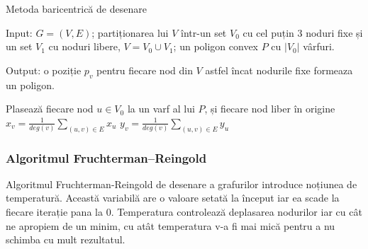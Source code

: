 \begin{algorithm}[H]
    \caption{Metoda baricentrică de desenare}
    Input: \(G=(V,E)\);\newline
    partiționarea lui \(V\) într-un set \(V_0\) cu cel puțin 3 noduri fixe și un set \(V_1\) cu noduri libere, \(V=V_0 \cup V_1\);\newline
    un poligon convex \(P\) cu \(|V_0|\) vârfuri.\newline

    Output: o poziție \(p_v\) pentru fiecare nod din \(V\) astfel încat nodurile fixe formeaza un poligon.
        
    \begin{algorithmic}[1]
        \State Plasează fiecare nod \(u \in V_0\) la un varf al lui \(P\), și fiecare nod liber în origine
        \Repeat
            \State \(x_v=\frac{1}{deg(v)} \sum_{(u,v) \in E} x_u\)
            \State \(y_v=\frac{1}{deg(v)} \sum_{(u,v) \in E} y_u\)
        \EndFor
    \end{algorithmic}
\end{algorithm}

\subsubsection{Algoritmul Fruchterman–Reingold}

Algoritmul Fruchterman-Reingold de desenare a grafurilor introduce noțiunea de temperatură. Această variabilă are o valoare setată 
la început iar ea scade la fiecare iterație pana la \(0\). Temperatura controlează deplasarea nodurilor iar cu 
cât ne apropiem de un minim, cu atât temperatura v-a fi mai mică pentru a nu schimba cu mult rezultatul.

